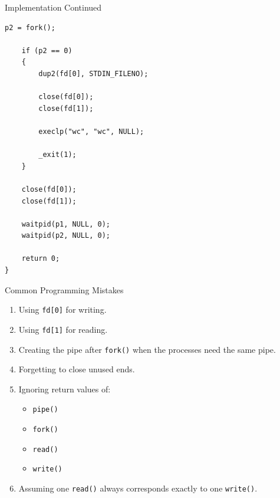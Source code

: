 \documentclass[aspectratio=169]{beamer}
\begin{document}
\begin{frame}[fragile]{Implementation Continued}

\begin{lstlisting}[style=cstyle]
    p2 = fork();

    if (p2 == 0)
    {
        dup2(fd[0], STDIN_FILENO);

        close(fd[0]);
        close(fd[1]);

        execlp("wc", "wc", NULL);

        _exit(1);
    }

    close(fd[0]);
    close(fd[1]);

    waitpid(p1, NULL, 0);
    waitpid(p2, NULL, 0);

    return 0;
}
\end{lstlisting}

\end{frame}

\begin{frame}{Common Programming Mistakes}

\begin{enumerate}

    \item Using \texttt{fd[0]} for writing.

    \item Using \texttt{fd[1]} for reading.

    \item Creating the pipe after \texttt{fork()} when the processes need the
    same pipe.

    \item Forgetting to close unused ends.

    \item Ignoring return values of:
    \begin{itemize}
        \item \texttt{pipe()}
        \item \texttt{fork()}
        \item \texttt{read()}
        \item \texttt{write()}
    \end{itemize}

    \item Assuming one \texttt{read()} always corresponds exactly to one
    \texttt{write()}.

\end{enumerate}

\end{frame}
\end{document}
